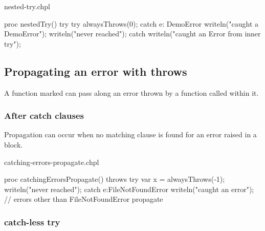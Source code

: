 \begin{chapelexample}{nested-try.chpl}
\begin{chapel}
proc nestedTry() {
  try {
    try {
      alwaysThrows(0);
    } catch e: DemoError {
      writeln("caught a DemoError");
    }
    writeln("never reached");
  } catch {
    writeln("caught an Error from inner try");
  }
}
\end{chapel}
\begin{chapelpost}
\end{chapelpost}
\begin{chapeloutput}
\end{chapeloutput}
\end{chapelexample}

\subsection{Propagating an error with throws}
\label{Propagating_an_error_with_throws}

A function marked  can pass along an error thrown by a
function called within it.

\subsubsection{After catch clauses}
\label{After_catch_clauses}

Propagation can occur when no matching  clause is found for an
error raised in a  block.

\begin{chapelexample}{catching-errors-propagate.chpl}
\begin{chapel}
proc catchingErrorsPropagate() throws {
  try {
    var x = alwaysThrows(-1);
    writeln("never reached");
  } catch e:FileNotFoundError {
    writeln("caught an error");
  }
  // errors other than FileNotFoundError propagate
}
\end{chapel}
\begin{chapelpost}
\end{chapelpost}
\begin{chapeloutput}
\end{chapeloutput}
\end{chapelexample}

\subsubsection{catch-less try}
\label{catch_less_try}

